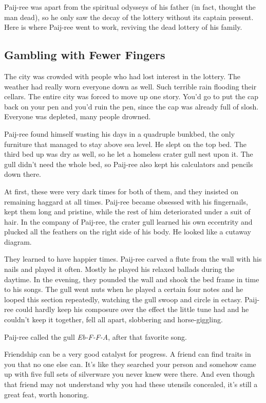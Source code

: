 \documentclass[12pt,twoside]{report}
\begin{document}
Paij-ree was apart from the spiritual odysseys of his father (in fact,
thought the man dead), so he only saw the decay of the lottery without
its captain present.  Here is where Paij-ree went to work, reviving
the dead lottery of his family.



\subsection{Gambling with Fewer Fingers}



The city was crowded with people who had lost interest in the lottery.
The weather had really worn everyone down as well.  Such terrible rain
flooding their cellars. The entire city was forced to move up one
story.  You'd go to put the cap back on your pen and you'd ruin the
pen, since the cap was already full of slosh.  Everyone was depleted,
many people drowned.

Paij-ree found himself wasting his days in a quadruple bunkbed, the
only furniture that managed to stay above sea level.  He slept on the
top bed.  The third bed up was dry as well, so he let a homeless
crater gull nest upon it.  The gull didn't need the whole bed, so
Paij-ree also kept his calculators and pencils down there.

At first, these were very dark times for both of them, and they
insisted on remaining haggard at all times.  Paij-ree became obsessed
with his fingernails, kept them long and pristine, while the rest of
him deteriorated under a suit of hair.  In the company of Paij-ree,
the crater gull learned his own eccentrity and plucked all the
feathers on the right side of his body.  He looked like a cutaway
diagram.

They learned to have happier times.  Paij-ree carved a flute from the
wall with his nails and played it often.  Mostly he played his relaxed
ballads during the daytime.  In the evening, they pounded the wall and
shook the bed frame in time to his songs.  The gull went nuts when he
played a certain four notes and he looped this section repeatedly,
watching the gull swoop and circle in ectasy.  Paij-ree could hardly
keep his composure over the effect the little tune had and he couldn't
keep it together, fell all apart, slobbering and horse-giggling.

Paij-ree called the gull {\em Eb-F-F-A}, after that favorite song.

Friendship can be a very good catalyst for progress.  A friend can
find traits in you that no one else can.  It's like they searched your
person and somehow came up with five full sets of silverware you never
knew were there.  And even though that friend may not understand why
you had these utensils concealed, it's still a great feat, worth
honoring.
\end{document}
